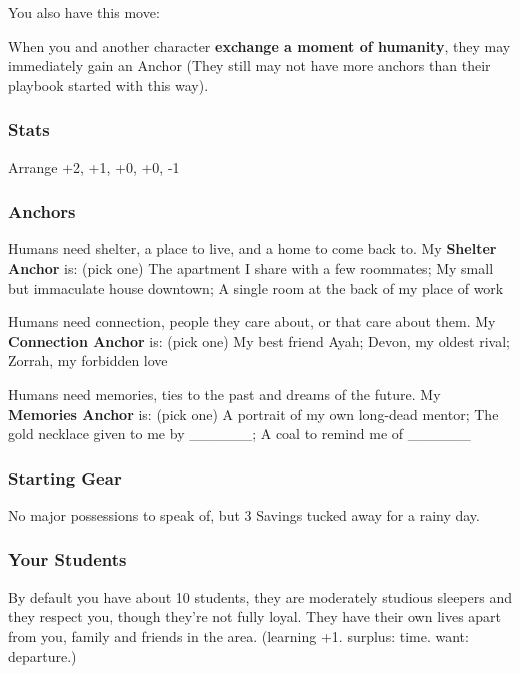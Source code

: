 \documentclass[
]{article}
\begin{document}
You also have this move:

When you and another character \textbf{exchange a moment of humanity},
they may immediately gain an Anchor (They still may not have more
anchors than their playbook started with this way).

\hypertarget{stats-2}{%
\subsubsection{Stats}\label{stats-2}}

Arrange +2, +1, +0, +0, -1

\hypertarget{anchors-1}{%
\subsubsection{Anchors}\label{anchors-1}}

Humans need shelter, a place to live, and a home to come back to. My
\textbf{Shelter Anchor} is: (pick one) The apartment I share with a few
roommates; My small but immaculate house downtown; A single room at the
back of my place of work

Humans need connection, people they care about, or that care about them.
My \textbf{Connection Anchor} is: (pick one) My best friend Ayah; Devon,
my oldest rival; Zorrah, my forbidden love

Humans need memories, ties to the past and dreams of the future. My
\textbf{Memories Anchor} is: (pick one) A portrait of my own long-dead
mentor; The gold necklace given to me by \_\_\_\_\_\_; A coal to remind
me of \_\_\_\_\_\_

\hypertarget{starting-gear-1}{%
\subsubsection{Starting Gear}\label{starting-gear-1}}

No major possessions to speak of, but 3 Savings tucked away for a rainy
day.

\hypertarget{your-students}{%
\subsubsection{Your Students}\label{your-students}}

By default you have about 10 students, they are moderately studious
sleepers and they respect you, though they're not fully loyal. They have
their own lives apart from you, family and friends in the area.
(learning +1. surplus: time. want: departure.)
\end{document}
